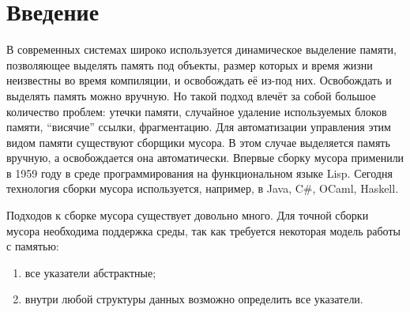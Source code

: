 \documentclass[12pt,a4paper]{article}
\renewcommand\baselinestretch{1.5}
\begin{document}
	



\tableofcontents    
\newpage
\section*{Введение}
В современных системах широко используется динамическое выделение памяти, позволяющее 
выделять память под объекты, размер которых и время жизни неизвестны во время компиляции, 
и освобождать её из-под них. Освобождать и выделять память можно вручную. Но такой
подход влечёт за собой большое количество проблем: утечки памяти, случайное удаление 
используемых блоков памяти, ``висячие'' ссылки, фрагментацию. Для автоматизации управления этим видом 
памяти существуют сборщики мусора. В этом случае выделяется память вручную, а освобождается 
она автоматически. Впервые сборку мусора применили в 1959 году в среде программирования 
на функциональном языке Lisp. Сегодня технология сборки мусора используется, например,
в Java, C\#, OCaml, Haskell.

Подходов к сборке мусора существует довольно много. Для точной сборки мусора необходима 
поддержка среды, так как требуется некоторая модель работы с памятью:
\begin{enumerate}
\item все указатели абстрактные;
\item внутри любой структуры данных возможно определить все указатели.
\end{enumerate}
\end{document}
